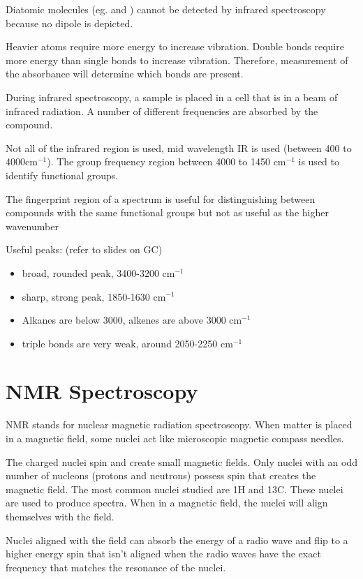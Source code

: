 			Diatomic molecules (eg.  and ) cannot be detected by infrared spectroscopy because no dipole is depicted.

			Heavier atoms require more energy to increase vibration. Double bonds require more energy than single bonds to increase vibration. Therefore, measurement of the absorbance will determine which bonds are present.

			During infrared spectroscopy, a sample is placed in a cell that is in a beam of infrared radiation. A number of different frequencies are absorbed by the compound.

			Not all of the infrared region is used, mid wavelength IR is used (between 400 to 4000cm$^{-1}$). The group frequency region between 4000 to 1450 cm$^{-1}$ is used to identify functional groups.

			The fingerprint region of a spectrum is useful for distinguishing between compounds with the same functional groups but not as useful as the higher wavenumber

			Useful peaks: (refer to slides on GC)

			\begin{itemize}
				\item broad, rounded peak, 3400-3200 cm$^{-1}$
				\item sharp, strong peak, 1850-1630 cm$^{-1}$
				\item Alkanes are below 3000, alkenes are above 3000 cm$^{-1}$
				\item triple bonds are very weak, around 2050-2250 cm$^{-1}$
			\end{itemize}

\section{NMR Spectroscopy} \label{02/06/2025}

	NMR stands for nuclear magnetic radiation spectroscopy. When matter is placed in a magnetic field, some nuclei act like microscopic magnetic compass needles.

	The charged nuclei spin and create small magnetic fields. Only nuclei with an odd number of nucleons (protons and neutrons) possess spin that creates the magnetic field. The most common nuclei studied are 1H and 13C. These nuclei are used to produce spectra. When in a magnetic field, the nuclei will align themselves with the field.

	Nuclei aligned with the field can absorb the energy of a radio wave and flip to a higher energy spin that isn't aligned when the radio waves have the exact frequency that matches the resonance of the nuclei.

